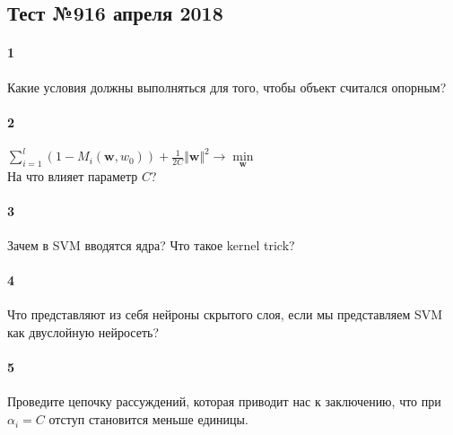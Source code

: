 \documentclass[a4paper,12pt]{article}
\begin{document}
  \subsection*{Тест №9\hfill{16 апреля 2018}}

  
  \paragraph{1} Какие условия должны выполняться для того, чтобы объект считался опорным?

  \makebox[\linewidth]{\hrulefill}
  \makebox[\linewidth]{\hrulefill}

  \paragraph{2} $ \sum\limits_{i=1}^l (1 - M_i(\mathbf{w}, w_0)) + \frac{1}{2C}\Vert \mathbf{w} \Vert^2 \rightarrow \min\limits_{\mathbf{w}}$\\
  На что влияет параметр $C$?
	
  \makebox[\linewidth]{\hrulefill}
  \makebox[\linewidth]{\hrulefill}
  \makebox[\linewidth]{\hrulefill}
	
  \paragraph{3} Зачем в SVM вводятся ядра? Что такое kernel trick?

  \makebox[\linewidth]{\hrulefill}
  \makebox[\linewidth]{\hrulefill}

  \paragraph{4} Что представляют из себя нейроны скрытого слоя, если мы представляем SVM как двуслойную нейросеть?

  \makebox[\linewidth]{\hrulefill}
  \makebox[\linewidth]{\hrulefill}
  \makebox[\linewidth]{\hrulefill}
  \makebox[\linewidth]{\hrulefill}

  \paragraph{5} Проведите цепочку рассуждений, которая приводит нас к заключению, что при $\alpha_i = C$ отступ становится меньше единицы.

  \makebox[\linewidth]{\hrulefill}
  \makebox[\linewidth]{\hrulefill}
  \makebox[\linewidth]{\hrulefill}
  \makebox[\linewidth]{\hrulefill}
  \makebox[\linewidth]{\hrulefill}
 
\end{document}
